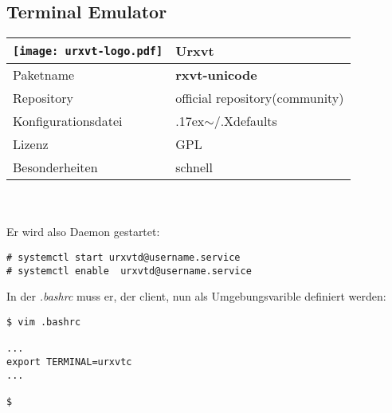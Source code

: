 \subsection{Terminal Emulator}
\begin{tabular}{l|l}
\texttt{[image: urxvt-logo.pdf]} & Urxvt \\ \hline
Paketname & \textbf{rxvt-unicode} \\ 
Repository & official repository(community) \\
Konfigurationsdatei & {{\raise.17ex\hbox{$\scriptstyle\mathtt{\sim}$}}/.Xdefaults} \\
Lizenz & GPL \\
Besonderheiten & schnell \\
\end{tabular}
\\ \\
Er wird also Daemon gestartet: 
\begin{lstlisting}[style=Bash]
# systemctl start urxvtd@username.service
# systemctl enable  urxvtd@username.service
\end{lstlisting}
In der \emph{.bashrc} muss er, der client, nun als Umgebungsvarible definiert werden:
\begin{lstlisting}[style=Bash]
$ vim .bashrc 

...
export TERMINAL=urxvtc
...

$
\end{lstlisting}
